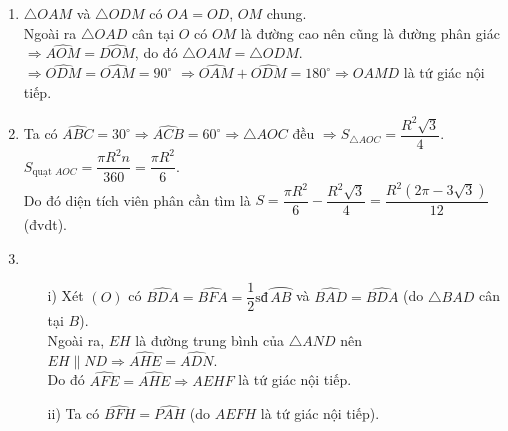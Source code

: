 \begin{bt}
{\begin{center}
		\end{center}
		\begin{enumerate}
			\item $\triangle OAM$ và $\triangle ODM$ có $OA = OD$, $OM$ chung.\\
			Ngoài ra $\triangle OAD$ cân tại $O$ có $OM$ là đường cao nên cũng là đường phân giác \\ 
			$\Rightarrow \widehat{AOM} = \widehat{DOM}$, do đó $\triangle OAM = \triangle ODM$.\\
			$\Rightarrow \widehat{ODM} = \widehat{OAM} = 90^\circ$
			$\Rightarrow \widehat{OAM} + \widehat{ODM} = 180^\circ \Rightarrow OAMD$ là tứ giác nội tiếp.
			\item Ta có $\widehat{ABC} = 30^\circ \Rightarrow \widehat{ACB} = 60^\circ \Rightarrow \triangle AOC$ đều $\Rightarrow S_{\triangle AOC} = \dfrac{R^2\sqrt{3}}{4}$.\\
			$S_{\text{quạt }AOC} = \dfrac{\pi R^2n}{360} = \dfrac{\pi R^2}{6}$.\\
			Do đó diện tích viên phân cần tìm là $S = \dfrac{\pi R^2}{6} - \dfrac{R^2\sqrt{3}}{4} = \dfrac{R^2(2\pi - 3\sqrt{3})}{12}$ (đvdt).
			\item 
			\begin{enumerate}
				\item[i)] Xét $(O)$ có $\widehat{BDA} = \widehat{BFA} = \dfrac{1}{2}\text{sđ}\,\wideparen{AB}$ và $\widehat{BAD} = \widehat{BDA}$ (do $\triangle BAD$ cân tại $B$).\\
				Ngoài ra, $EH$ là đường trung bình của $\triangle AND$ nên $EH \parallel ND \Rightarrow \widehat{AHE} = \widehat{ADN}$.\\
				Do đó $\widehat{AFE} = \widehat{AHE} \Rightarrow AEHF$ là tứ giác nội tiếp.
				\item[ii)] Ta có $\widehat{BFH} = \widehat{PAH}$ (do $AEFH$ là tứ giác nội tiếp).\\

\end{enumerate}
\end{enumerate}}
\end{bt}
